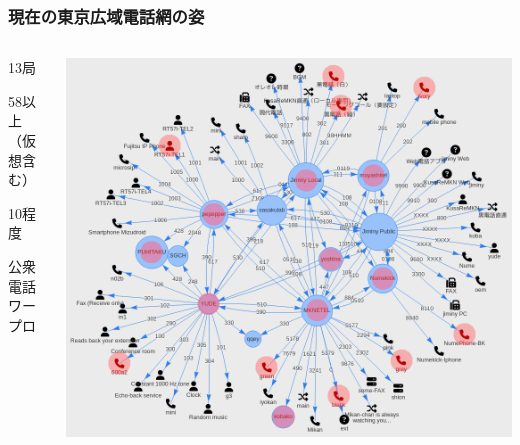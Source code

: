 \documentclass[
  lualatex,
  aspectratio=169,
  14pt
]{beamer}
\begin{document}
\begin{frame}
  \frametitle{現在の東京広域電話網の姿}

  \begin{columns}
    \begin{column}{.25\textwidth}
      \begin{description}[labelwidth=\linewidth]
        \item[交換局数]
          13局
        \item[端末数]
          58以上\\
          （仮想含む）
        \item[うち黒電話]
          10程度
        \item[その他]
          公衆電話\\
          ワープロ
      \end{description}
    \end{column}
    \begin{column}{.7\textwidth}
      \centering
      \includegraphics[height=.87\textheight]{./images/mantela2.png}
    \end{column}
  \end{columns}
\end{frame}
\end{document}
